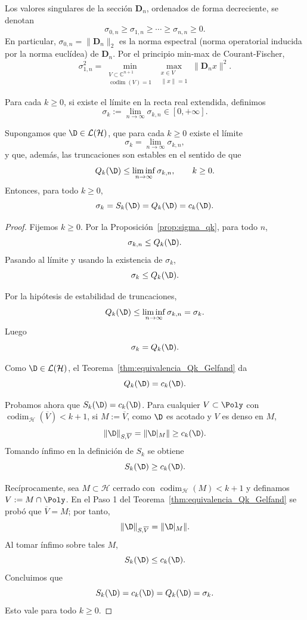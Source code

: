 \begin{defn}\label{def:sigma_kn}
	Los valores singulares de la sección $\mathbf{D}_n$, ordenados de forma decreciente, se denotan
	\[
		\sigma_{0,n} \geq \sigma_{1,n} \geq \cdots \geq \sigma_{n,n} \geq 0.
	\]
	En particular, $\sigma_{0,n} = \|\mathbf{D}_n\|_2$ es la norma espectral (norma operatorial inducida por la norma euclídea) de $\mathbf{D}_n$. Por el principio min-max de Courant-Fischer,
	\[
		\sigma_{1,n}^2 = \min_{\substack{V \subset \mathbb{C}^{n+1} \\ \operatorname{codim}(V) = 1}} \max_{\substack{x \in V \\ \|x\| = 1}} \|\mathbf{D}_n x\|^2.
	\]
\end{defn}

\begin{defn}\label{def:indice_Sigma_k}
	Para cada $k\ge 0$, si existe el límite en la recta real extendida, definimos
	\[
		\sigma_k := \lim_{n\to\infty} \sigma_{k,n} \in [0,+\infty].
	\]
\end{defn}

\begin{prop}\label{prop:coincidencia_total_acotado_pendiente}
	Supongamos que $\D\in\mathcal{L}(\mathcal{H})$, que para cada $k\ge0$ existe el límite
	\[
		\sigma_k=\lim_{n\to\infty}\sigma_{k,n},
	\]
	y que, además, las truncaciones son estables en el sentido de que
	\[
		Q_k(\D)\le \liminf_{n\to\infty}\sigma_{k,n},
		\qquad k\ge0.
	\]
	Entonces, para todo $k\ge0$,
	\[
		\sigma_k=S_k(\D)=Q_k(\D)=c_k(\D).
	\]
\end{prop}

\begin{proof}
	Fijemos $k\ge 0$. Por la Proposición~\ref{prop:sigma_qk}, para todo $n$,
	\[
		\sigma_{k,n}\le Q_k(\D).
	\]
	Pasando al límite y usando la existencia de $\sigma_k$,
	\[
		\sigma_k\le Q_k(\D).
	\]

	Por la hipótesis de estabilidad de truncaciones,
	\[
		Q_k(\D)\le \liminf_{n\to\infty}\sigma_{k,n}=\sigma_k.
	\]
	Luego
	\[
		\sigma_k=Q_k(\D).
	\]

	Como $\D\in\mathcal L(\mathcal H)$, el Teorema~\ref{thm:equivalencia_Qk_Gelfand} da
	\[
		Q_k(\D)=c_k(\D).
	\]

	Probamos ahora que $S_k(\D)=c_k(\D)$. Para cualquier
	$V\subset\Poly$ con $\operatorname{codim}_{\mathcal H}(\overline V)<k+1$, si
	$M:=\overline V$, como $\D$ es acotado y $V$ es denso en $M$,
	\[
		\|\D\|_{S,\overline V}=\|\D|_M\|\ge c_k(\D).
	\]
	Tomando ínfimo en la definición de $S_k$ se obtiene
	\[
		S_k(\D)\ge c_k(\D).
	\]

	Recíprocamente, sea $M\subset\mathcal H$ cerrado con
	$\operatorname{codim}_{\mathcal H}(M)<k+1$ y definamos
	$V:=M\cap\Poly$. En el Paso 1 del
	Teorema~\ref{thm:equivalencia_Qk_Gelfand} se probó que $\overline V=M$; por tanto,
	\[
		\|\D\|_{S,\overline V}=\|\D|_M\|.
	\]
	Al tomar ínfimo sobre tales $M$,
	\[
		S_k(\D)\le c_k(\D).
	\]
	Concluimos que
	\[
		S_k(\D)=c_k(\D)=Q_k(\D)=\sigma_k.
	\]
	Esto vale para todo $k\ge0$.
\end{proof}

